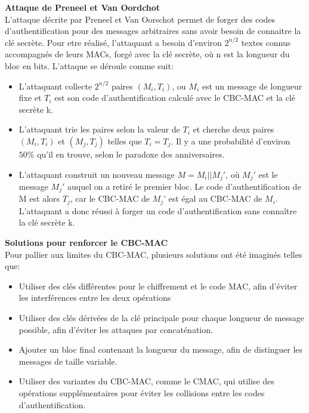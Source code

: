 \textbf{Attaque de Preneel et Van Oordchot}\\

L'attaque décrite par Preneel et Van Oorschot permet de forger des codes d'authentification pour des messages arbitraires sans avoir besoin de connaitre la clé secrète. Pour etre réalisé, l'attaquant a besoin d'environ  $2^{n/2}$ textes connus accompagnés de leurs MACs, forgé avec la clé secrète, où n est la longueur du bloc en bits. L’attaque se déroule comme suit:


\begin{itemize}
    \item [\textbullet] L’attaquant collecte $2^{n/2}$ paires $(M_i, T_i)$, ou $M_i$ est un message de longueur fixe et $T_i$ est son code d’authentification calculé avec le CBC-MAC et la clé secrète k.
    \item [\textbullet] L’attaquant trie les paires selon la valeur de $T_i$ et cherche deux paires $(M_i, T_i)$ et $(M_j, T_j)$ telles que $T_i = T_j$. Il y a une probabilité d’environ $50\%$ qu’il en trouve, selon le paradoxe des anniversaires.
    \item [\textbullet] L’attaquant construit un nouveau message $M = M_i || M_j'$, où $M_j'$ est le message $M_j'$ auquel on a retiré le premier bloc. Le code d’authentification de M est alors $T_j$, car le CBC-MAC de $M_j’$ est égal au CBC-MAC de $M_i$. L’attaquant a donc réussi à forger un code d’authentification sans connaître la clé secrète k.\\
\end{itemize} 

\textbf{Solutions pour renforcer le CBC-MAC}\\

Pour pallier aux limites du CBC-MAC, plusieurs solutions ont été imaginés telles que:

\begin{itemize} 
    \item [\textbullet] Utiliser des clés différentes pour le chiffrement et le code MAC, afin d’éviter les interférences entre les deux opérations
    \item [\textbullet] Utiliser des clés dérivées de la clé principale pour chaque longueur de message possible, afin d’éviter les attaques par concaténation.
    \item [\textbullet] Ajouter un bloc final contenant la longueur du message, afin de distinguer les messages de taille variable.
    \item [\textbullet] Utiliser des variantes du CBC-MAC, comme le CMAC, qui utilise des opérations supplémentaires pour éviter les collisions entre les codes d’authentification.
\end{itemize}
